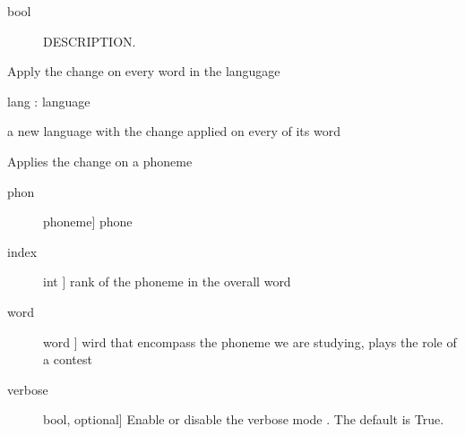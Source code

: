 \documentclass[letterpaper,10pt,english]{sphinxmanual}
\begin{document}
\begin{fulllineitems}
\begin{fulllineitems}
\begin{description}
\end{description}
\begin{description}
\item[{bool}] \leavevmode
\sphinxAtStartPar
DESCRIPTION.

\end{description}

\end{fulllineitems}


\begin{fulllineitems}
\label{\detokenize{index:Change.P_change.apply_language}}
\sphinxAtStartPar
Apply the change on every word in the langugage

\sphinxAtStartPar
lang : language

\sphinxAtStartPar
a new language with the change applied on every of its word

\end{fulllineitems}


\begin{fulllineitems}
\label{\detokenize{index:Change.P_change.apply_phon}}
\sphinxAtStartPar
Applies the change on a phoneme
\begin{description}
\item[{phon}] \leavevmode{[}phoneme{]}
\sphinxAtStartPar
phone

\item[{index}] \leavevmode{[}int {]}
\sphinxAtStartPar
rank of the phoneme in the overall word

\item[{word}] \leavevmode{[}word {]}
\sphinxAtStartPar
wird that encompass the phoneme we are studying, plays the role of a contest

\item[{verbose}] \leavevmode{[}bool, optional{]}
\sphinxAtStartPar
Enable or disable the verbose mode . The default is True.


\end{description}
\end{fulllineitems}
\end{fulllineitems}
\end{document}
